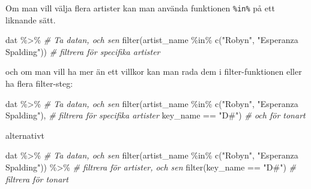 \documentclass[
]{book}
\newenvironment{Shaded}{\begin{snugshade}}{\end{snugshade}}
\newcommand{\CommentTok}[1]{\textcolor[rgb]{0.56,0.35,0.01}{\textit{#1}}}
\newcommand{\FunctionTok}[1]{\textcolor[rgb]{0.00,0.00,0.00}{#1}}
\newcommand{\NormalTok}[1]{#1}
\newcommand{\SpecialCharTok}[1]{\textcolor[rgb]{0.00,0.00,0.00}{#1}}
\newcommand{\StringTok}[1]{\textcolor[rgb]{0.31,0.60,0.02}{#1}}
\theoremstyle{definition}
\theoremstyle{definition}
\theoremstyle{definition}
\theoremstyle{definition}
\theoremstyle{remark}
\begin{document}
Om man vill välja flera artister kan man använda funktionen \texttt{\%in\%} på ett liknande sätt.

\begin{Shaded}
\begin{Highlighting}[]
\NormalTok{dat }\SpecialCharTok{\%\textgreater{}\%}                                                              \CommentTok{\# Ta datan, och sen}
  \FunctionTok{filter}\NormalTok{(artist\_name }\SpecialCharTok{\%in\%} \FunctionTok{c}\NormalTok{(}\StringTok{"Robyn"}\NormalTok{, }\StringTok{"Esperanza Spalding"}\NormalTok{))          }\CommentTok{\# filtrera för specifika artister}
\end{Highlighting}
\end{Shaded}

och om man vill ha mer än ett villkor kan man rada dem i filter-funktionen eller ha flera filter-steg:

\begin{Shaded}
\begin{Highlighting}[]
\NormalTok{dat }\SpecialCharTok{\%\textgreater{}\%}                                                              \CommentTok{\# Ta datan, och sen}
  \FunctionTok{filter}\NormalTok{(artist\_name }\SpecialCharTok{\%in\%} \FunctionTok{c}\NormalTok{(}\StringTok{"Robyn"}\NormalTok{, }\StringTok{"Esperanza Spalding"}\NormalTok{),          }\CommentTok{\# filtrera för specifika artister}
\NormalTok{         key\_name }\SpecialCharTok{==} \StringTok{"D\#"}\NormalTok{)                                           }\CommentTok{\# och för tonart}
\end{Highlighting}
\end{Shaded}

alternativt

\begin{Shaded}
\begin{Highlighting}[]
\NormalTok{dat }\SpecialCharTok{\%\textgreater{}\%}                                                              \CommentTok{\# Ta datan, och sen}
  \FunctionTok{filter}\NormalTok{(artist\_name }\SpecialCharTok{\%in\%} \FunctionTok{c}\NormalTok{(}\StringTok{"Robyn"}\NormalTok{, }\StringTok{"Esperanza Spalding"}\NormalTok{)) }\SpecialCharTok{\%\textgreater{}\%}      \CommentTok{\# filtrera för artister, och sen}
  \FunctionTok{filter}\NormalTok{(key\_name }\SpecialCharTok{==} \StringTok{"D\#"}\NormalTok{)                                           }\CommentTok{\# filtrera för tonart}
\end{Highlighting}
\end{Shaded}
\end{document}
